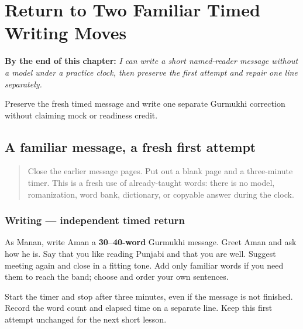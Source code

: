 
\chapter{Return to Two Familiar Timed Writing Moves}
\label{ch:pa-timed-writing-r3}

\begin{chapteropening}
\textbf{By the end of this chapter:} \emph{I can write a short named-reader message without a model under a practice clock, then preserve the first attempt and repair one line separately.}

Preserve the fresh timed message and write one separate Gurmukhi correction without claiming mock or readiness credit.
\end{chapteropening}

\section[(a familiar reader, a fresh short clock)]{A familiar message, a fresh first attempt}

\label{lesson:PA-R173-message-timed-again}



\begin{quote}
Close the earlier message pages. Put out a blank page and a three-minute timer. This is a fresh use of already-taught words: there is no model, romanization, word bank, dictionary, or copyable answer during the clock.
\end{quote}

\subsection*{Writing — independent timed return}
As Manan, write Aman a \textbf{30–40-word} Gurmukhi message. Greet Aman and ask how he is. Say that you like reading Punjabi and that you are well. Suggest meeting again and close in a fitting tone. Add only familiar words if you need them to reach the band; choose and order your own sentences.

Start the timer and stop after three minutes, even if the message is not finished. Record the word count and elapsed time on a separate line. Keep this first attempt unchanged for the next short lesson.

